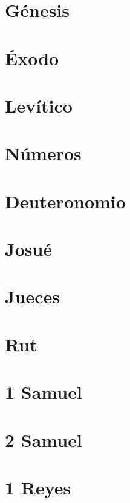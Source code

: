 \chapter{Génesis}


\chapter{Éxodo}



\chapter{Levítico}



\chapter{Números}



\chapter{Deuteronomio}



\chapter{Josué}



\chapter{Jueces}



\chapter{Rut}



\chapter{1 Samuel}



\chapter{2 Samuel}



\chapter{1 Reyes}




